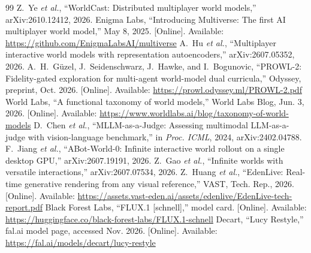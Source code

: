 \documentclass[conference]{IEEEtran}
\begin{document}
\begin{thebibliography}{99}
 Z.~Ye \emph{et al.}, ``WorldCast: Distributed multiplayer world models,'' arXiv:2610.12412, 2026.
 Enigma Labs, ``Introducing Multiverse: The first AI multiplayer world model,'' May 8, 2025. [Online]. Available: \url{https://github.com/EnigmaLabsAI/multiverse}
 A.~Hu \emph{et al.}, ``Multiplayer interactive world models with representation autoencoders,'' arXiv:2607.05352, 2026.
 A.~H.~G\"uzel, J.~Seidenschwarz, J.~Hawke, and I.~Bogunovic, ``PROWL-2: Fidelity-gated exploration for multi-agent world-model dual curricula,'' Odyssey, preprint, Oct. 2026. [Online]. Available: \url{https://prowl.odyssey.ml/PROWL-2.pdf}
 World Labs, ``A functional taxonomy of world models,'' World Labs Blog, Jun. 3, 2026. [Online]. Available: \url{https://www.worldlabs.ai/blog/taxonomy-of-world-models}
 D.~Chen \emph{et al.}, ``MLLM-as-a-Judge: Assessing multimodal LLM-as-a-judge with vision-language benchmark,'' in \emph{Proc. ICML}, 2024, arXiv:2402.04788.
 F.~Jiang \emph{et al.}, ``ABot-World-0: Infinite interactive world rollout on a single desktop GPU,'' arXiv:2607.19191, 2026.
 Z.~Gao \emph{et al.}, ``Infinite worlds with versatile interactions,'' arXiv:2607.07534, 2026.
 Z.~Huang \emph{et al.}, ``EdenLive: Real-time generative rendering from any visual reference,'' VAST, Tech. Rep., 2026. [Online]. Available: \url{https://assets.vast-eden.ai/assets/edenlive/EdenLive-tech-report.pdf}
 Black Forest Labs, ``FLUX.1 [schnell],'' model card. [Online]. Available: \url{https://huggingface.co/black-forest-labs/FLUX.1-schnell}
 Decart, ``Lucy Restyle,'' fal.ai model page, accessed Nov. 2026. [Online]. Available: \url{https://fal.ai/models/decart/lucy-restyle}
\end{thebibliography}
\end{document}
